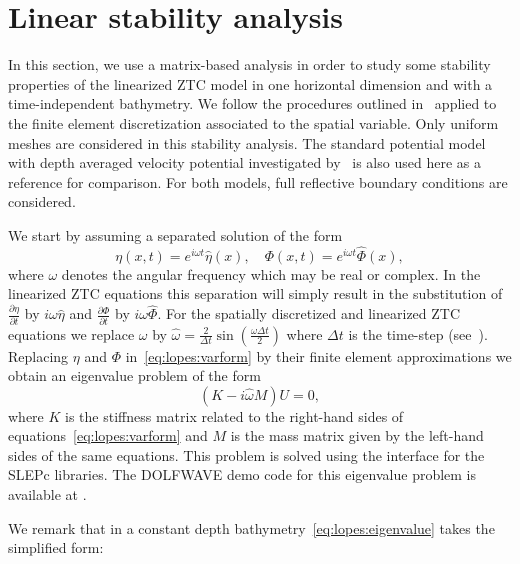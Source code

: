 
\section{Linear stability analysis}\label{sec:lopes:linearanalysis}
In this section, we use a matrix-based analysis in order to
study some stability properties of the linearized ZTC model
in one horizontal dimension and with a time-independent
bathymetry. We follow the procedures outlined
in~\citet{LovholtPedersen2009} applied to the finite element
discretization associated to the spatial variable.  Only
uniform meshes are considered in this stability analysis.
The standard potential model with depth averaged velocity
potential investigated by~\citet{LovholtPedersen2009} is also
used here as a reference for comparison.  For both models,
full reflective boundary conditions are considered.

We start by assuming  a separated  solution of the form
\begin{equation}\label{eq:lopes:exp}
\eta(x,t)=e^{i\omega t}\hat\eta(x),\quad
\Phi(x,t)=e^{i\omega t}\hat\Phi(x),
\end{equation}
where  $\omega$ denotes the  angular frequency which
may be real or complex.
In the linearized ZTC equations this separation will simply
result in the substitution of $\frac{\partial \eta}{\partial
t}$ by $i\omega \hat\eta$ and $\frac{\partial \Phi}{\partial
t}$ by $i\omega \hat\Phi$.
For the spatially discretized and linearized ZTC equations
we replace $\omega$ by $\hat\omega=\frac{2}{\Delta
t}\sin\left(\frac{\omega \Delta t}{2}\right)$ where $\Delta
t$ is the time-step (see~\citet{LovholtPedersen2009}).
Replacing $\eta$ and $\Phi$ in~\eqref{eq:lopes:varform} by
their finite element approximations
 we obtain an eigenvalue problem of the form
\begin{equation}\label{eq:lopes:eigenvalue}
(K- i\hat\omega M) U=0,
\end{equation}
where $K$ is the stiffness matrix related to the right-hand
sides of equations~\eqref{eq:lopes:varform} and $M$ is the mass
matrix given by the left-hand sides of the same equations.
This problem is solved using the \dolfin interface for the
SLEPc libraries.  The DOLFWAVE demo code for this eigenvalue problem
is available at .

We remark that in  a constant depth
bathymetry~\eqref{eq:lopes:eigenvalue}
takes the simplified form:

